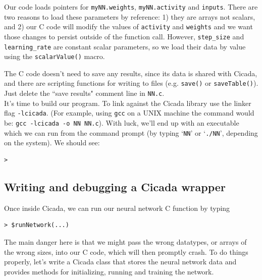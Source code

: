 \documentclass{article}
\newenvironment{code}{
       \begin{list}{}{
               \setlength{\leftmargin}{.4in}
               \setlength{\rightmargin}{0in}
               \setlength{\topsep}{.2in}
       }
       \small
       \item[] }
       { \end{list}   }
\begin{document}
\noindent Our code loads pointers for \verb#myNN.weights#, \verb#myNN.activity# and \verb#inputs#.  There are two reasons to load these parameters by reference: 1) they are arrays not scalars, and 2) our C code will modify the values of \verb#activity# and \verb#weights# and we want those changes to persist outside of the function call.  However, \verb#step_size# and \verb#learning_rate# are constant scalar parameters, so we load their data by value using the \verb#scalarValue()# macro.

The C code doesn't need to save any results, since its data is shared with Cicada, and there are scripting functions for writing to files (e.g. \verb#save()# or  \verb#saveTable()#).  Just delete the ``save results" comment line in \verb#NN.c#.\\

It's time to build our program.  To link against the Cicada library use the linker flag \verb#-lcicada#.  (For example, using \verb#gcc# on a UNIX machine the command would be: \verb#gcc -lcicada -o NN NN.c#).  With luck, we'll end up with an executable which we can run from the command prompt (by typing `\verb#NN#' or `\verb#./NN#', depending on the system).  We should see:

\begin{code} \begin{verbatim}
> 
\end{verbatim} \end{code}





\subsection{Writing and debugging a Cicada wrapper}

Once inside Cicada, we can run our neural network C function by typing

\begin{code} \begin{verbatim}
> $runNetwork(...)
\end{verbatim} \end{code}

\noindent The main danger here is that we might pass the wrong datatypes, or arrays of the wrong sizes, into our C code, which will then promptly crash.  To do things properly, let's write a Cicada class that stores the neural network data and provides methods for initializing, running and training the network.
\end{document}
